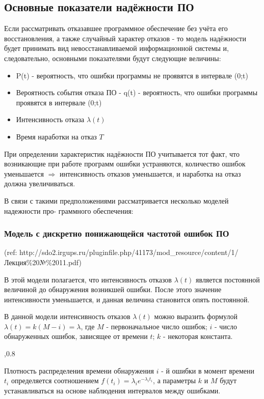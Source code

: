 \documentclass[a4paper, 12pt]{extarticle}
\begin{document}
		\subsection{Основные показатели надёжности ПО}
		Если рассматривать отказавшее программное обеспечение без учёта его восстановления, а также случайный характер отказов - то модель надёжности будет принимать вид невосстанавливаемой информационной системы и, следовательно, основными показателями будут следующие величины:
		\begin{itemize}
			\item P(t) - вероятность, что ошибки программы не проявятся в интервале (0;t)
			\item Вероятность события отказа ПО - q(t) - вероятность, что ошибки программы проявятся в интервале (0;t)
			\item Интенсивность отказа $\lambda(t)$
			\item Время наработки на отказ $T$
		\end{itemize}

		При определении характеристик надёжности ПО учитывается тот факт, что возникающие при работе программ ошибки устраняются, количество ошибок уменьшается $\Rightarrow$ интенсивность отказов уменьшается, и наработка на отказ должна увеличиваться.

	 В связи с такими предположениями рассматривается несколько моделей надежности про-
граммного обеспечения:

	\subsubsection{Модель   с  дискретно понижающейся частотой ошибок ПО}
		(ref: http://sdo2.irgups.ru/pluginfile.php/41173/mod\_resource/content/1/Лекция\%20№\%2011.pdf)

		В этой модели полагается, что интенсивность отказов $\lambda(t)$ является постоянной величиной до обнаружения возникшей ошибки. После этого значение интенсивности уменьшается, и данная величина становится опять постоянной.

		В данной модели интенсивность отказов $\lambda(t)$ можно выразить формулой $\lambda(t) = k(M-i) = \lambda$, где $M$ - первоначальное число ошибок; $i$ -  число обнаруженных ошибок, зависящее от времени $t$; $k$ - некоторая константа.

		,0.8

		Плотность распределения времени обнаружения $i$ - й ошибки в момент времени $t_i$
 определяется соотношением $f(t_i) =\lambda_i e^{-\lambda_it_i}$, а параметры $k$ и $M$ будут устанавливаться на основе наблюдения интервалов между ошибками.
\end{document}
